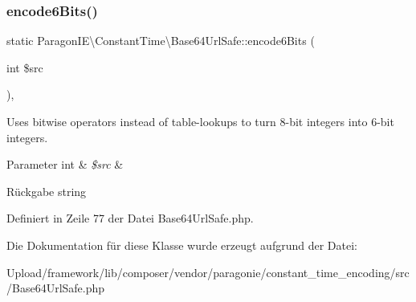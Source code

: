 \subsubsection{\texorpdfstring{encode6\+Bits()}{encode6Bits()}}
{\footnotesize\ttfamily static Paragon\+I\+E\textbackslash{}\+Constant\+Time\textbackslash{}\+Base64\+Url\+Safe\+::encode6\+Bits (\begin{DoxyParamCaption}\item[{int}]{\$src }\end{DoxyParamCaption})\hspace{0.3cm}{\ttfamily [static]}, {\ttfamily [protected]}}

Uses bitwise operators instead of table-\/lookups to turn 8-\/bit integers into 6-\/bit integers.


\begin{DoxyParams}[1]{Parameter}
int & {\em \$src} & \\
\hline
\end{DoxyParams}
\begin{DoxyReturn}{Rückgabe}
string 
\end{DoxyReturn}


Definiert in Zeile 77 der Datei Base64\+Url\+Safe.\+php.



Die Dokumentation für diese Klasse wurde erzeugt aufgrund der Datei\+:\begin{DoxyCompactItemize}
\item 
Upload/framework/lib/composer/vendor/paragonie/constant\+\_\+time\+\_\+encoding/src/Base64\+Url\+Safe.\+php\end{DoxyCompactItemize}
